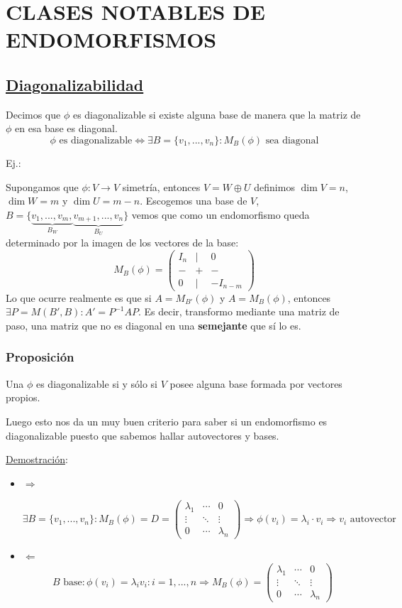 \documentclass[10pt,a4paper,openright]{book}
\begin{document}
\section*{CLASES NOTABLES DE ENDOMORFISMOS}
\subsection*{\underline{Diagonalizabilidad}}
Decimos que $\phi$ es diagonalizable si existe alguna base de manera que la matriz de $\phi$ en esa base es diagonal.
$$\phi \mbox{ es diagonalizable}\Leftrightarrow \exists B=\{v_1, ..., v_n\}: M_{B}(\phi)\mbox{ sea diagonal}$$

Ej.:

Supongamos que $\phi: V\rightarrow V$ simetría, entonces $V=W\oplus U$ definimos $\dim V=n$, $\dim W=m$ y $\dim U = m-n$. Escogemos una base de $V$, $B=\{\underbrace{v_1, ..., v_m,}_{B_W} \underbrace{v_{m+1}, ..., v_n}_{B_U}\}$ vemos que como un endomorfismo queda determinado por la imagen de los vectores de la base:
$$M_B(\phi)=\begin{pmatrix}
I_n & | & 0 \\ - & + & - \\ 0 & | & -I_{n-m}
\end{pmatrix}$$
Lo que ocurre realmente es que si $A=M_{B'}(\phi)$ y $A=M_B(\phi)$, entonces $\exists P=M(B',B): A'=P^{-1}AP$. Es decir, transformo mediante una matriz de paso, una matriz que no es diagonal en una \textbf{semejante} que sí lo es.

\subsubsection*{Proposición}
Una $\phi$ es diagonalizable si y sólo si $V$ posee alguna base formada por vectores propios.

Luego esto nos da un muy buen criterio para saber si un endomorfismo es diagonalizable puesto que sabemos hallar autovectores y bases.

\underline{Demostración}:
\begin{itemize}
\item $\Rightarrow$

$$\exists B=\{v_1, ..., v_n\} : M_B(\phi)=D=\begin{pmatrix}
\lambda_1 & \cdots & 0 \\
\vdots & \ddots & \vdots \\
0 & \cdots & \lambda_n
\end{pmatrix}\Rightarrow \phi(v_i)=\lambda_i \cdot v_i\Rightarrow v_i \mbox{ autovector}$$

\item $\Leftarrow$
$$B\mbox{ base}: \phi(v_i)=\lambda_iv_i: i=1,..., n\Rightarrow M_B(\phi)=\begin{pmatrix}
\lambda_1 & \cdots & 0 \\
\vdots & \ddots & \vdots \\
0 & \cdots & \lambda_n
\end{pmatrix}$$
\end{itemize} 
\end{document}
